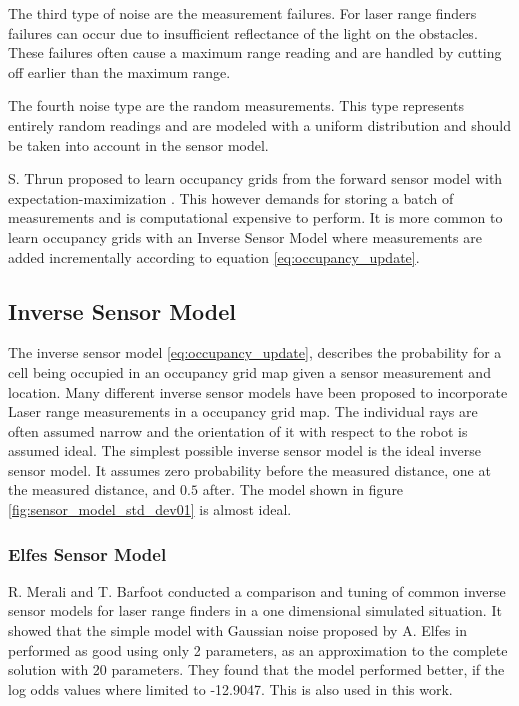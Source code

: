 The third type of noise are the measurement failures. 
For laser range finders failures can occur due to insufficient reflectance of the light on the obstacles. 
These failures often cause a maximum range reading and are handled by cutting off earlier than the maximum range.

The fourth noise type are the random measurements. This type represents entirely random readings and are modeled with a uniform distribution and should be taken into account in the sensor model.

S. Thrun proposed to learn occupancy grids from the forward sensor model with expectation-maximization \cite{probRob}.
This however demands for storing a batch of measurements and is computational expensive to perform. 
It is more common to learn occupancy grids with an Inverse Sensor Model where measurements are added incrementally according to equation \vref{eq:occupancy_update}. 

\subsection{Inverse Sensor Model}
The inverse sensor model \vref{eq:occupancy_update}, describes the probability for a cell being occupied in an occupancy grid map given a sensor measurement and location.
Many different inverse sensor models have been proposed to incorporate Laser range measurements in a occupancy grid map. The individual rays are often assumed narrow and the orientation of it with respect to the robot is assumed ideal.
The simplest possible inverse sensor model is the 
ideal inverse sensor model. It assumes zero probability before the measured distance, one at the measured distance, and $0.5$ after. The model shown in figure \vref{fig:sensor_model_std_dev01} is almost ideal.

\subsubsection{Elfes Sensor Model}
R. Merali and T. Barfoot \cite{sensorModelTuning} conducted a comparison and tuning of common inverse sensor models for laser range finders in a one dimensional simulated situation. It showed that the simple model with Gaussian noise proposed by A. Elfes in \cite{elfes} performed as good using only 2 parameters, as an approximation to the complete solution with 20 parameters. They found that the model performed better, if the log odds values where limited to -12.9047. This is also used in this work.

